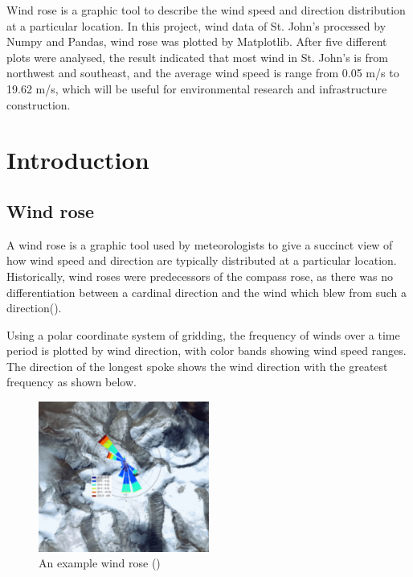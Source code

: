 \documentclass[10pt]{report}
\begin{document}
Wind rose is a graphic tool to describe the wind speed and direction distribution at a particular location. In this project, wind data of St. John's processed by Numpy and Pandas, wind rose was plotted by Matplotlib. After five different plots were analysed, the result indicated that most wind in St. John's is from northwest and southeast, and the average wind speed is range from 0.05 m/s to 19.62 m/s, which will be useful for environmental research and infrastructure construction.


\singlespacing          %
\listoffigures          %


 \tableofcontents


 \chapter{Introduction}     %
 
 \section{Wind rose}

A wind rose is a graphic tool used by meteorologists to give a succinct view of how wind speed and direction are typically distributed at a particular location. Historically, wind roses were predecessors of the compass rose, as there was no differentiation between a cardinal direction and the wind which blew from such a direction(\cite{wikipedia}). \par Using a polar coordinate system of gridding, the frequency of winds over a time period is plotted by wind direction, with color bands showing wind speed ranges. The direction of the longest spoke shows the wind direction with the greatest frequency as shown below. \par

\begin{figure}[h!]
    \centering
    \includegraphics[width=0.50\textwidth]{images/example.png}
    \caption{An example wind rose (\cite{Roubeyrie2018})}
    \label{fig: PaleBlueDot}
\end{figure}
\end{document}
